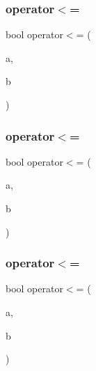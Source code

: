 \mbox{\label{class_f_l___f_p_a420177af32f27b84621b1bdc1db5d29a}} 
\subsubsection{\texorpdfstring{operator$<$=}{operator<=}\hspace{0.1cm}{\footnotesize\ttfamily [1/3]}}
{\footnotesize\ttfamily bool operator$<$= (\begin{DoxyParamCaption}\item[{const \hyperlink{class_f_l___f_p}{F\+L\+\_\+\+FP} \&}]{a,  }\item[{const \hyperlink{class_f_l___f_p}{F\+L\+\_\+\+FP} \&}]{b }\end{DoxyParamCaption})\hspace{0.3cm}{\ttfamily [friend]}}

\mbox{\label{class_f_l___f_p_a2453dc97f7fd85f4a1c07f5d888c4b87}} 
\subsubsection{\texorpdfstring{operator$<$=}{operator<=}\hspace{0.1cm}{\footnotesize\ttfamily [2/3]}}
{\footnotesize\ttfamily bool operator$<$= (\begin{DoxyParamCaption}\item[{const \hyperlink{class_f_l___f_p}{F\+L\+\_\+\+FP} \&}]{a,  }\item[{const double \&}]{b }\end{DoxyParamCaption})\hspace{0.3cm}{\ttfamily [friend]}}

\mbox{\label{class_f_l___f_p_a78d1e2f69d82635ea82a2b717d79d5bb}} 
\subsubsection{\texorpdfstring{operator$<$=}{operator<=}\hspace{0.1cm}{\footnotesize\ttfamily [3/3]}}
{\footnotesize\ttfamily bool operator$<$= (\begin{DoxyParamCaption}\item[{const double \&}]{a,  }\item[{const \hyperlink{class_f_l___f_p}{F\+L\+\_\+\+FP} \&}]{b }\end{DoxyParamCaption})\hspace{0.3cm}{\ttfamily [friend]}}

